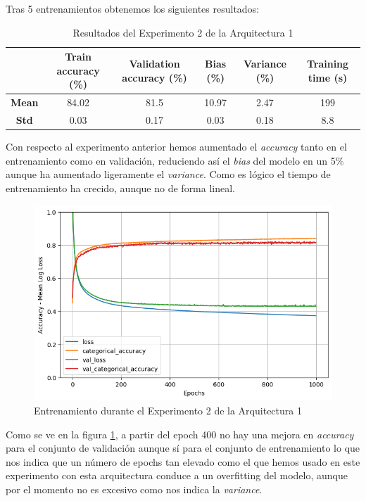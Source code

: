\documentclass{article}
\begin{document}
			Tras 5 entrenamientos obtenemos los siguientes resultados:
			\begin{table}[!h]
				\begin{center}
					\begin{tabular}{ c | c | c | c | c | c |}
						\ & \textbf{Train accuracy (\%)} & \textbf{Validation accuracy (\%)} & \textbf{Bias (\%)} & \textbf{Variance (\%)} & \textbf{Training time (s)} \\ \hline
						\textbf{Mean} & 84.02 & 81.5 & 10.97 & 2.47 & 199\\ \hline
						\textbf{Std} & 0.03 & 0.17 & 0.03 & 0.18 & 8.8 \\ \hline
					\end{tabular}
					\caption{Resultados del Experimento 2 de la Arquitectura 1}
					\label{tab:res-a1-e2}
				\end{center}
			\end{table}
			Con respecto al experimento anterior hemos aumentado el \textit{accuracy} tanto en el entrenamiento como en validaci\'on, reduciendo as\'i el \textit{bias} del modelo en un 5\% aunque ha aumentado ligeramente el \textit{variance}. Como es l\'ogico el tiempo de entrenamiento ha crecido, aunque no de forma lineal.\\
			\begin{figure}[!h]
				\begin{center}
					\includegraphics[scale=0.5]{tr-a1-e2.png}		
					\caption{Entrenamiento durante el Experimento 2 de la Arquitectura 1}	
					\label{tr-a1-e2}
				\end{center}
			\end{figure}
			Como se ve en la figura \ref{tr-a1-e2}, a partir del epoch 400 no hay una mejora en \textit{accuracy} para el conjunto de validaci\'on aunque s\'i para el conjunto de entrenamiento lo que nos indica que un n\'umero de epochs tan elevado como el que hemos usado en este experimento con esta arquitectura conduce a un overfitting del modelo, aunque por el momento no es excesivo como nos indica la \textit{variance}.
			
\end{document}
